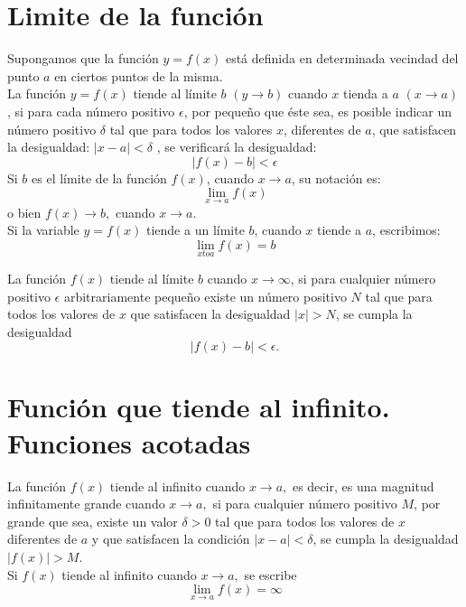 \section{Limite de la función}
    
    \begin{tcolorbox}[colframe = white]
	\begin{def.}
	    Supongamos que la función $y=f(x)$ está definida en determinada vecindad del punto $a$ en ciertos puntos de la misma.\\
	    La función $y=f(x)$ tiende al límite $b$ $(y\rightarrow b)$ cuando $x$ tienda a $a$ $(x\rightarrow a)$, si para cada número positivo $\epsilon$, por pequeño que éste sea, es posible indicar un número positivo $\delta$ tal que para todos los valores $x$, diferentes de $a$, que satisfacen la desigualdad: $|x-a|<\delta$ , se verificará la desigualdad: $$|f(x)-b|< \epsilon$$ Si $b$ es el límite de la función $f(x)$, cuando $x\rightarrow a$, su notación es: $$\lim_{x \to a} f(x)$$ o bien $f(x)\rightarrow b,$ cuando $x\rightarrow a.$\\
	    Si la variable $y=f(x)$ tiende a un límite $b$, cuando $x$ tiende a $a$, escribimos: $$\lim_{x to a} f(x) = b$$
	\end{def.}
    \end{tcolorbox}

    \begin{tcolorbox}[colframe = white]
	\begin{def.}
	    La función $f(x)$ tiende al límite $b$ cuando $x\rightarrow \infty$, si para cualquier número positivo $\epsilon$ arbitrariamente pequeño existe un número positivo $N$ tal que para todos los valores de $x$ que satisfacen la desigualdad $|x| > N$, se cumpla la desigualdad $$|f(x) - b| < \epsilon.$$
	\end{def.}
    \end{tcolorbox}

\section{Función que tiende al infinito. Funciones acotadas}

    \begin{tcolorbox}[colframe=white]
	\begin{def.}
	    La función $f(x)$ tiende al infinito cuando $x \rightarrow a,$ es decir, es una magnitud infinitamente grande cuando $x\rightarrow a,$ si para cualquier número positivo $M$, por grande que sea, existe un valor $\delta > 0$ tal que para todos los valores de $x$ diferentes de $a$ y que satisfacen la condición $|x-a|< \delta$, se cumpla la desigualdad $|f(x)|>M$.\\
	    Si $f(x)$ tiende al infinito cuando $x \rightarrow a,$ se escribe $$\lim_{x \to a} f(x) = \infty$$
	\end{def.}
    \end{tcolorbox}

